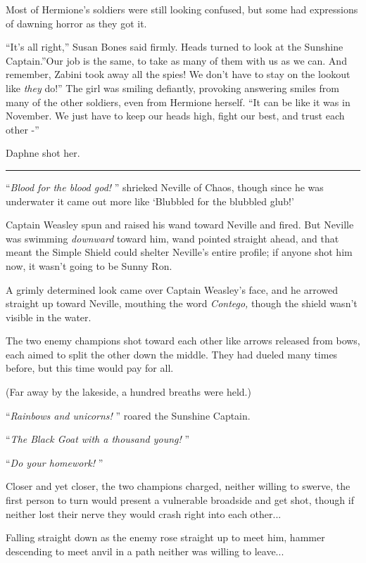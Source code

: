 Most of Hermione's soldiers were still looking confused, but some had
expressions of dawning horror as they got it.

``It's all right,'' Susan Bones said firmly. Heads turned to look at the
Sunshine Captain.''Our job is the same, to take as many of them with us
as we can. And remember, Zabini took away all the spies! We don't have
to stay on the lookout like \emph{they} do!'' The girl was smiling
defiantly, provoking answering smiles from many of the other soldiers,
even from Hermione herself. ``It can be like it was in November. We just
have to keep our heads high, fight our best, and trust each other -''

Daphne shot her.

\begin{center}\rule{3in}{0.4pt}\end{center}

``\emph{Blood for the blood god!} '' shrieked Neville of Chaos, though
since he was underwater it came out more like `Blubbled for the blubbled
glub!'

Captain Weasley spun and raised his wand toward Neville and fired. But
Neville was swimming \emph{downward} toward him, wand pointed straight
ahead, and that meant the Simple Shield could shelter Neville's entire
profile; if anyone shot him now, it wasn't going to be Sunny Ron.

A grimly determined look came over Captain Weasley's face, and he
arrowed straight up toward Neville, mouthing the word \emph{Contego,}
though the shield wasn't visible in the water.

The two enemy champions shot toward each other like arrows released from
bows, each aimed to split the other down the middle. They had dueled
many times before, but this time would pay for all.

(Far away by the lakeside, a hundred breaths were held.)

``\emph{Rainbows and unicorns!} '' roared the Sunshine Captain.

``\emph{The Black Goat with a thousand young!} ''

``\emph{Do your homework!} ''

Closer and yet closer, the two champions charged, neither willing to
swerve, the first person to turn would present a vulnerable broadside
and get shot, though if neither lost their nerve they would crash right
into each other...

Falling straight down as the enemy rose straight up to meet him, hammer
descending to meet anvil in a path neither was willing to leave...

